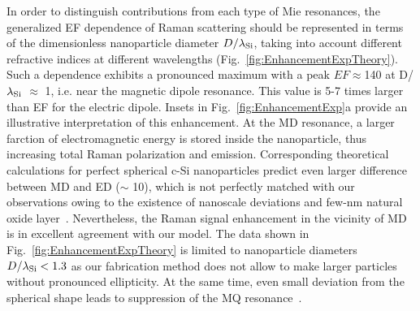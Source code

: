         In order to distinguish contributions from each type of Mie resonances, the generalized EF dependence of Raman
        scattering should be represented in terms of the dimensionless nanoparticle diameter $D/\lambda_{\rm Si}$,
        taking into account different refractive indices at different wavelengths (Fig.~\ref{fig:EnhancementExpTheory}). Such a dependence
        exhibits a pronounced maximum with a peak $EF\approx$140 at D/$\lambda_{\rm Si}$ $\approx$ 1, i.e. near the
        magnetic dipole resonance. This value is 5-7 times larger than EF for the electric dipole. Insets in Fig.~\ref{fig:EnhancementExp}a
        provide an illustrative interpretation of this enhancement. At the MD resonance, a larger farction of electromagnetic
        energy is stored inside the nanoparticle, thus increasing total Raman polarization and emission.
        Corresponding theoretical calculations for perfect spherical c-Si nanoparticles predict even larger difference between
        MD and ED ($\sim$ 10), which is not perfectly matched with our observations owing to the existence of nanoscale
        deviations and few-nm natural oxide layer~\cite{fu2012directional, zywietz2015electromagnetic}. Nevertheless, the
        Raman signal enhancement in the vicinity of MD is in excellent agreement with our model. The data shown in Fig.~\ref{fig:EnhancementExpTheory}
        is limited to nanoparticle diameters $D/\lambda_{\rm Si}<1.3$ as our fabrication method does not allow to make larger
        particles without pronounced ellipticity. At the same time, even small deviation from the spherical shape leads to
        suppression of the MQ resonance~\cite{fu2012directional}.
